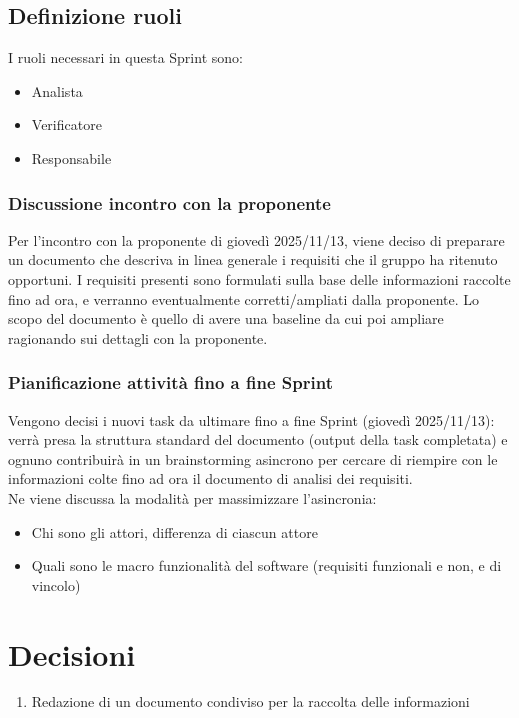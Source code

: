 \documentclass[a4paper,12pt]{article}
\begin{document}
\subsection{Definizione ruoli}
I ruoli necessari in questa Sprint sono:
\begin{itemize}[noitemsep]
    \item Analista
    \item Verificatore
    \item Responsabile
\end{itemize}

\subsubsection{Discussione incontro con la proponente}
Per l'incontro con la proponente di giovedì 2025/11/13, viene deciso di preparare un documento che descriva in linea generale i requisiti che il gruppo ha ritenuto opportuni. I requisiti 
presenti sono formulati sulla base delle informazioni raccolte fino ad ora, e verranno eventualmente corretti/ampliati dalla proponente. Lo scopo del documento è quello di avere una baseline da cui
poi ampliare ragionando sui dettagli con la proponente. \\

\subsubsection{Pianificazione attività fino a fine Sprint}
Vengono decisi i nuovi task da ultimare fino a fine Sprint (giovedì 2025/11/13): verrà presa la struttura standard del documento (output della task completata) e ognuno contribuirà in un brainstorming asincrono per cercare di riempire con le informazioni colte fino ad ora il documento di analisi dei requisiti. \\ 
Ne viene discussa la modalità per massimizzare l'asincronia:
\begin{itemize}[noitemsep]
    \item Chi sono gli attori, differenza di ciascun attore
    \item Quali sono le macro funzionalità del software (requisiti funzionali e non, e di vincolo)
\end{itemize}

\section{Decisioni}
\begin{enumerate}[noitemsep]
    \item Redazione di un documento condiviso per la raccolta delle informazioni
\end{enumerate}
\end{document}

